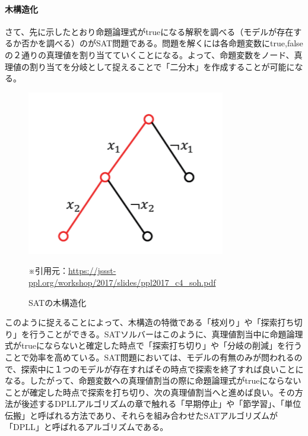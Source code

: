 \documentclass[dvipdfmx]{jsarticle}
\begin{document}
\paragraph{木構造化}さて、先に示したとおり命題論理式がtrueになる解釈を調べる（モデルが存在するか否かを調べる）のがSAT問題である。問題を解くには各命題変数にtrue,falseの２通りの真理値を割り当てていくことになる。よって、命題変数をノード、真理値の割り当てを分岐として捉えることで「二分木」を作成することが可能になる。
\begin{figure}[H]
  \centering
  \includegraphics[scale=0.6]{cap1.png}
  \caption{SATの木構造化}
  ※引用元：\url{https://jssst-ppl.org/workshop/2017/slides/ppl2017_c4_soh.pdf}
\end{figure}
このように捉えることによって、木構造の特徴である「枝刈り」や「探索打ち切り」を行うことができる。SATソルバーはこのように、真理値割当中に命題論理式がtrueにならないと確定した時点で「探索打ち切り」や「分岐の削減」を行うことで効率を高めている。SAT問題においては、モデルの有無のみが問われるので、探索中に１つのモデルが存在すればその時点で探索を終了すれば良いことになる。したがって、命題変数への真理値割当の際に命題論理式がtrueにならないことが確定した時点で探索を打ち切り、次の真理値割当へと進めば良い。その方法が後述するDPLLアルゴリズムの章で触れる「早期停止」や「節学習」、「単位伝搬」と呼ばれる方法であり、それらを組み合わせたSATアルゴリズムが「DPLL」と呼ばれるアルゴリズムである。
\end{document}
